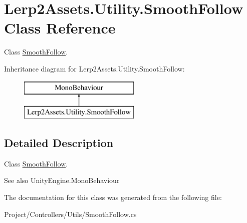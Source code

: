 \hypertarget{class_lerp2_assets_1_1_utility_1_1_smooth_follow}{}\section{Lerp2\+Assets.\+Utility.\+Smooth\+Follow Class Reference}
\label{class_lerp2_assets_1_1_utility_1_1_smooth_follow}


Class \hyperlink{class_lerp2_assets_1_1_utility_1_1_smooth_follow}{Smooth\+Follow}.  


Inheritance diagram for Lerp2\+Assets.\+Utility.\+Smooth\+Follow\+:\begin{figure}[H]
\begin{center}
\leavevmode
\includegraphics[height=2.000000cm]{class_lerp2_assets_1_1_utility_1_1_smooth_follow}
\end{center}
\end{figure}


\subsection{Detailed Description}
Class \hyperlink{class_lerp2_assets_1_1_utility_1_1_smooth_follow}{Smooth\+Follow}. 

\begin{DoxySeeAlso}{See also}
Unity\+Engine.\+Mono\+Behaviour


\end{DoxySeeAlso}


The documentation for this class was generated from the following file\+:\begin{DoxyCompactItemize}
\item 
Project/\+Controllers/\+Utils/Smooth\+Follow.\+cs\end{DoxyCompactItemize}
